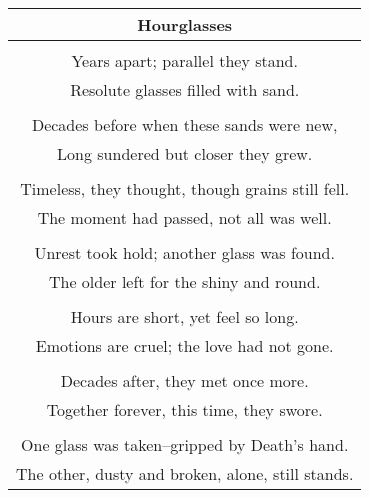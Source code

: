 \documentclass{article}
\begin{document}
\begin{center}
\begin{tabular}{c}
\textbf{Hourglasses} \\ \hline
\\
Years apart; parallel they stand. \\
Resolute glasses filled with sand. \\
\\
Decades before when these sands were new, \\
Long sundered but closer they grew. \\
\\
Timeless, they thought, though grains still fell. \\
The moment had passed, not all was well. \\
\\
Unrest took hold; another glass was found. \\
The older left for the shiny and round. \\
\\
Hours are short, yet feel so long. \\
Emotions are cruel; the love had not gone. \\
\\
Decades after, they met once more. \\
Together forever, this time, they swore. \\
\\
One glass was taken--gripped by Death's hand. \\
The other, dusty and broken, alone, still stands. \\
\end{tabular}
\end{center}
\end{document}
